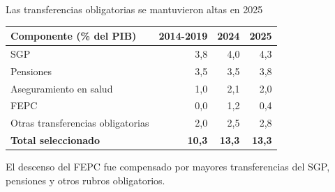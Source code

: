 \begin{frame}{Las transferencias obligatorias se mantuvieron altas en 2025}
\centering
\small
\begin{tabular}{lrrr}
\toprule
\textbf{Componente (\% del PIB)} & \textbf{2014-2019} & \textbf{2024} & \textbf{2025} \\
\midrule
SGP                               & 3,8 & 4,0 & 4,3 \\
Pensiones                         & 3,5 & 3,5 & 3,8 \\
Aseguramiento en salud            & 1,0 & 2,1 & 2,0 \\
FEPC                              & 0,0 & 1,2 & 0,4 \\
Otras transferencias obligatorias & 2,0 & 2,5 & 2,8 \\
\midrule
\textbf{Total seleccionado}       & \textbf{10,3} & \textbf{13,3} & \textbf{13,3} \\
\bottomrule
\end{tabular}
\vspace{0.25cm}
\scriptsize El descenso del FEPC fue compensado por mayores transferencias del SGP, pensiones y otros rubros obligatorios.
\end{frame}